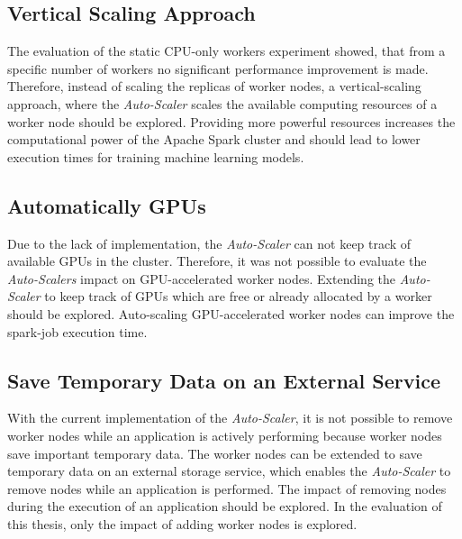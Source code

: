 \subsection{Vertical Scaling Approach}
The evaluation of the static CPU-only workers experiment showed, that from a specific number of workers no significant performance improvement is made.
Therefore, instead of scaling the replicas of worker nodes, a vertical-scaling approach, where the \textit{Auto-Scaler} scales the available computing resources of a worker node should be explored.
Providing more powerful resources increases the computational power of the Apache Spark cluster and should lead to lower execution times for training machine learning models.


\subsection{Automatically GPUs}
\label{subsec:08_outlook_gpus}
Due to the lack of implementation, the \textit{Auto-Scaler} can not keep track of available GPUs in the cluster. Therefore, it was not possible to evaluate the \textit{Auto-Scalers} impact on GPU-accelerated worker nodes.
Extending the \textit{Auto-Scaler} to keep track of GPUs which are free or already allocated by a worker should be explored.
%
Auto-scaling GPU-accelerated worker nodes can improve the spark-job execution time.


\subsection{Save Temporary Data on an External Service}
With the current implementation of the \textit{Auto-Scaler}, it is not possible to remove worker nodes while an application is actively performing because worker nodes save important temporary data.
The worker nodes can be extended to save temporary data on an external storage service, which enables the \textit{Auto-Scaler} to remove nodes while an application is performed.
% 
The impact of removing nodes during the execution of an application should be explored. In the evaluation of this thesis, only the impact of adding worker nodes is explored.

